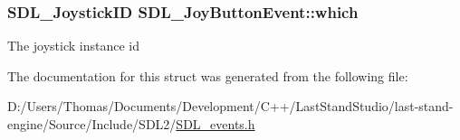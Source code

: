 \subsubsection[{which}]{\setlength{\rightskip}{0pt plus 5cm}S\+D\+L\+\_\+\+Joystick\+I\+D S\+D\+L\+\_\+\+Joy\+Button\+Event\+::which}\label{structSDL__JoyButtonEvent_a1679049adad7242b28420948fdc79044}
The joystick instance id 

The documentation for this struct was generated from the following file\+:\begin{DoxyCompactItemize}
\item 
D\+:/\+Users/\+Thomas/\+Documents/\+Development/\+C++/\+Last\+Stand\+Studio/last-\/stand-\/engine/\+Source/\+Include/\+S\+D\+L2/\hyperlink{SDL__events_8h}{S\+D\+L\+\_\+events.\+h}\end{DoxyCompactItemize}
